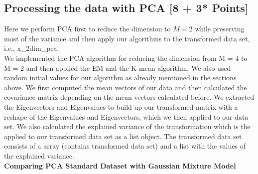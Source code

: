 \documentclass[a4paper]{article}
\begin{document}
\newpage
\subsection{Processing the data with PCA [8 + 3* Points]}
Here we perform PCA first to reduce the dimension to $M = 2$ while preserving most of the variance and then apply our algorithms to the transformed data set, i.e., x\_2dim\_pca. \\

\noindent
We implemented the PCA algorithm for reducing the dimension from M = 4 to M = 2 and then applied the EM and the K-mean algorithm. We also used random initial values for our algorithm as already mentioned in the sections above. We first computed the mean vectors of our data and then calculated the covariance matrix depending on the mean vectors calculated before. We extracted the Eigenvectors and Eigenvalues to build up our transformed matrix with a reshape of the Eigenvalues and Eigenvectors, which we then applied to our data set. We also calculated the explained variance of the transformation which is the applied to our transformed data set as a list object. The transformed data set consists of a array (contains transformed data set) and a list with the values of the explained variance. \\

\noindent
{\large \textbf{Comparing PCA Standard Dataset with Gaussian Mixture Model}} \\

  
\end{document}
